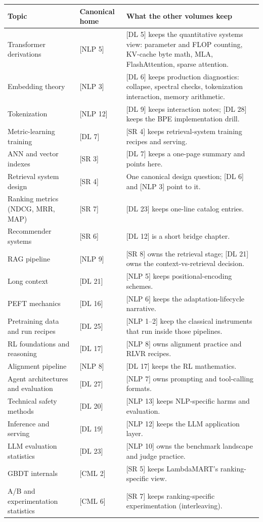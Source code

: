 \begin{tabularx}{\textwidth}{@{}l l X@{}}
\toprule
\textbf{Topic} & \textbf{Canonical home} & \textbf{What the other volumes keep} \\
\midrule
Transformer derivations & [NLP 5] & [DL 5] keeps the quantitative systems view: parameter and FLOP counting, KV-cache byte math, MLA, FlashAttention, sparse attention. \\
Embedding theory & [NLP 3] & [DL 6] keeps production diagnostics: collapse, spectral checks, tokenization interaction, memory arithmetic. \\
Tokenization & [NLP 12] & [DL 9] keeps interaction notes; [DL 28] keeps the BPE implementation drill. \\
Metric-learning training & [DL 7] & [SR 4] keeps retrieval-system training recipes and serving. \\
ANN and vector indexes & [SR 3] & [DL 7] keeps a one-page summary and points here. \\
Retrieval system design & [SR 4] & One canonical design question; [DL 6] and [NLP 3] point to it. \\
Ranking metrics (NDCG, MRR, MAP) & [SR 7] & [DL 23] keeps one-line catalog entries. \\
Recommender systems & [SR 6] & [DL 12] is a short bridge chapter. \\
RAG pipeline & [NLP 9] & [SR 8] owns the retrieval stage; [DL 21] owns the context-vs-retrieval decision. \\
Long context & [DL 21] & [NLP 5] keeps positional-encoding schemes. \\
PEFT mechanics & [DL 16] & [NLP 6] keeps the adaptation-lifecycle narrative. \\
Pretraining data and run recipes & [DL 25] & [NLP 1--2] keep the classical instruments that run inside those pipelines. \\
RL foundations and reasoning & [DL 17] & [NLP 8] owns alignment practice and RLVR recipes. \\
Alignment pipeline & [NLP 8] & [DL 17] keeps the RL mathematics. \\
Agent architectures and evaluation & [DL 27] & [NLP 7] owns prompting and tool-calling formats. \\
Technical safety methods & [DL 20] & [NLP 13] keeps NLP-specific harms and evaluation. \\
Inference and serving & [DL 19] & [NLP 12] keeps the LLM application layer. \\
LLM evaluation statistics & [DL 23] & [NLP 10] owns the benchmark landscape and judge practice. \\
GBDT internals & [CML 2] & [SR 5] keeps LambdaMART's ranking-specific view. \\
A/B and experimentation statistics & [CML 6] & [SR 7] keeps ranking-specific experimentation (interleaving). \\
\bottomrule
\end{tabularx}

